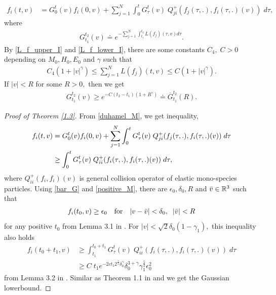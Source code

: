 \documentclass[reqno,10pt]{amsart}
\numberwithin{equation}{section}
\begin{document}
\begin{align} \label{duhamel_M}
    f_i(t,v) 
    &={G_{0}^{t}}(v) f_i(0,v) + \sum_{j=1}^{N} \int_0^t G_{\tau}^{t}(v)\;Q_{ji}^{+}(f_j(\tau,.),f_i(\tau,.)(v))\; d\tau, 
\end{align}
where 
\begin{align*}
    G_{t_1}^{t_2}(v) \doteq e^{-\sum_{j=1}^{N} {\int_{t_1}^{t_2}} L(f_j)(\tau, v)d\tau}.
\end{align*}
By \eqref{L_f_upper_I} and \eqref{L_f_lower_I}, there are some constants $C_4,\; C>0$ depending on $M_0, H_0, E_0$ and $\gamma$ such that
\begin{align*}
    C_4(1+|v|^{\gamma}) \leq \sum_{j=1}^{N} L(f_j)(t,v) \leq C(1+|v|^{\gamma}).
\end{align*} If $|v|<R$ for some $R>0,$ then we get
\begin{align} \label{bar_G}
    G_{t_1}^{t_2}(v) \geq e^{-C(t_2-t_1) (1+R^\gamma)}\doteq \overline{G}_{t_1}^{t_2}(R).
\end{align} \vspace{3mm}

\begin{proof} [Proof of Theorem \ref{1.3}]
From \eqref{duhamel_M}, we get inequality, 
\begin{align} \label{positive_M}
    f_i(t,v)  &= G_{0}^{t}(v) f_i(0,v) + \sum_{j=1}^{N} \int_0^t G_{\tau}^{t}(v)\;Q_{ji}^{+}(f_j(\tau,.),f_i(\tau,.)(v))\; d\tau \notag\\
    &\geq 
    \int_0^t G_{\tau}^{t}(v)\;Q_{ii}^{+}(f_i(\tau,.),f_i(\tau,.)(v))\; d\tau,
\end{align}
where $Q_{ii}^{+}(f_i,f_i)(v)$ is general collision operator of elastic mono-species particles. Using \eqref{bar_G} and \eqref{positive_M}, there are $\epsilon_0,\delta_0,R$ and $\Bar{v} \in \mathbb{R}^3$ such that 
\begin{align*}
    f_i(t_0,v) \geq  \epsilon_0 \quad \text{for} \quad |v-\Bar{v}|<\delta_0, \;\; |\Bar{v}|<R
\end{align*} for any positive $t_0$ from Lemma 3.1 in \cite{AB1996}.  For $|v|<\sqrt{2}\delta_0(1-\gamma_1),$ this inequality also holds
\begin{align*}
    f_i(t_0+t_1,v) 
    &\geq \int_{t_1}^{t_0+t_1} G_{\tau}^{t}(v)\;Q_{ii}^{+}(f_i(\tau,.),f_i(\tau,.)(v))\; d\tau \\
    &\geq  C \; t_1 e^{-2ct_1 2^{\frac{\gamma}{2}}\delta_0^{\gamma}} \delta_0^{3+\gamma}\gamma_1^{\frac{5}{2}}\epsilon_0^2
\end{align*}
from Lemma 3.2 in \cite{AB1996}. Similar as Theorem 1.1 in \cite{AB1996} and we get the Gaussian lowerbound. 
\end{proof}
\end{document}
